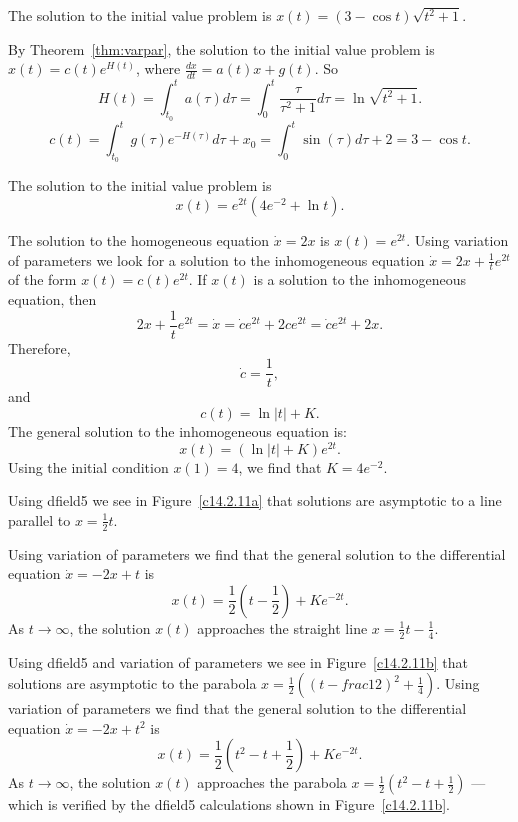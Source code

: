 \ans The solution to the initial value problem is
$x(t) = (3 - \cos t)\sqrt{t^2 + 1}$.

\soln By Theorem~\ref{thm:varpar}, the
solution to the initial value problem is $x(t) = c(t)e^{H(t)}$, where
$\frac{dx}{dt} = a(t)x + g(t)$.  So
\[
H(t) = \int_{t_0}^t a(\tau)d\tau = \int_0^t\frac{\tau}{\tau^2 + 1}d\tau
= \ln\sqrt{t^2 + 1}.
\]
\[
c(t) = \int_{t_0}^t g(\tau)e^{-H(\tau)}d\tau + x_0
= \int_0^t \sin(\tau)d\tau + 2
= 3 - \cos t.
\]

 \ans The solution to the initial value problem is
\[
x(t) = e^{2t}(4e^{-2}+\ln t).
\]

\soln The solution to the homogeneous equation $\dot{x}=2x$ is $x(t)=e^{2t}$.
 Using variation of parameters we look for a solution to the inhomogeneous
equation $\dot{x}=2x+\frac{1}{t}e^{2t}$ of the form $x(t)=c(t)e^{2t}$.  If
$x(t)$ is a solution to the inhomogeneous equation, then
\[
2x+\frac{1}{t}e^{2t} =\dot{x}=\dot{c}e^{2t}+2ce^{2t} = \dot{c}e^{2t}+2x.
\]
Therefore, 
\[
\dot{c} = \frac{1}{t},
\]
and 
\[
c(t) = \ln|t| + K.
\]
The general solution to the inhomogeneous equation is:
\[
x(t) = (\ln|t| + K)e^{2t}.
\]
Using the initial condition $x(1)=4$, we find that $K=4e^{-2}$.



 Using {\sf dfield5} we see in Figure~\ref{c14.2.11a} that
solutions are asymptotic to a line parallel to $x=\frac{1}{2}t$.

\begin{figure}[htb]
     \centerline{%
     }
\end{figure} 
Using variation of parameters we find that the general solution to the
differential equation $\dot{x}=-2x+t$ is 
\[
x(t) = \frac{1}{2}\left(t-\frac{1}{2}\right) +Ke^{-2t}.
\]
As $t\to\infty$, the solution $x(t)$ approaches the straight line 
$x= \frac{1}{2}t-\frac{1}{4}$.

  Using {\sf dfield5} and variation of parameters we see in 
Figure~\ref{c14.2.11b} that solutions are asymptotic to the
parabola $x=\frac{1}{2}((t-frac{1}{2})^2+\frac{1}{4})$.
Using variation of parameters we find that the general solution to the
differential equation $\dot{x}=-2x+t^2$ is 
\[
x(t) = \frac{1}{2}\left(t^2-t+\frac{1}{2}\right) + Ke^{-2t}.
\]
As $t\to\infty$, the solution $x(t)$ approaches the parabola  
$x= \frac{1}{2}(t^2-t+\frac{1}{2})$ --- which is verified by the 
{\sf dfield5} calculations shown in Figure~\ref{c14.2.11b}.

